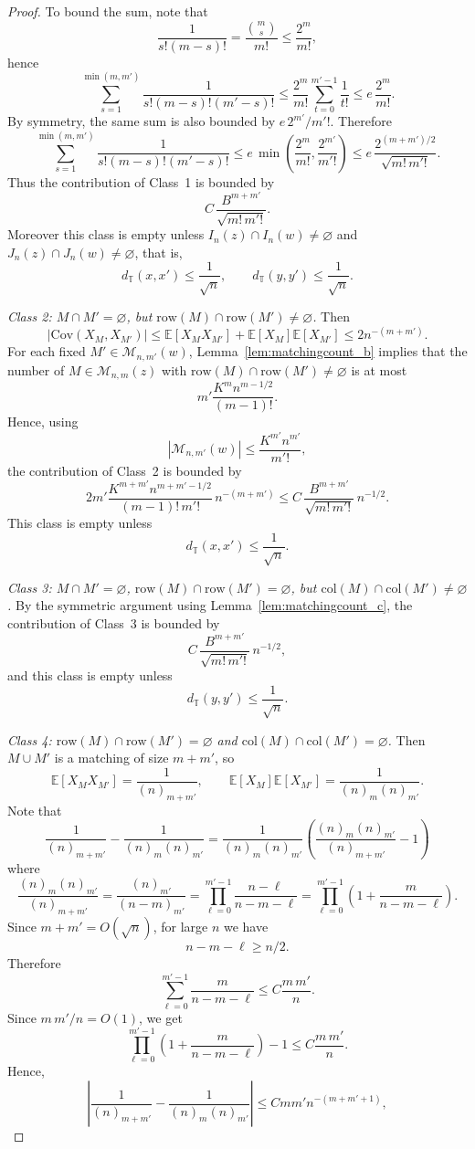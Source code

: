 \documentclass[11pt]{article}
\newcommand{\cov}{\mathrm{Cov}}
\begin{document}
\begin{proof}
To bound the sum, note that
\[
\frac{1}{s!(m-s)!}=\frac{\binom{m}{s}}{m!}\le \frac{2^m}{m!},
\]
hence
\[
\sum_{s=1}^{\min(m,m')}
\frac{1}{s!(m-s)!(m'-s)!}
\le
\frac{2^m}{m!}\sum_{t=0}^{m'-1}\frac{1}{t!}
\le
e\,\frac{2^m}{m!}.
\]
By symmetry, the same sum is also bounded by $e\,2^{m'}/m'!$. Therefore
\[
\sum_{s=1}^{\min(m,m')}
\frac{1}{s!(m-s)!(m'-s)!}
\le
e\,\min\!\left(\frac{2^m}{m!},\frac{2^{m'}}{m'!}\right)
\le
e\,\frac{2^{(m+m')/2}}{\sqrt{m!\,m'!}}.
\]
Thus the contribution of Class~1 is bounded by
\[
C\,\frac{B^{m+m'}}{\sqrt{m!\,m'!}}.
\]
Moreover this class is empty unless $I_n(z)\cap I_n(w)\neq\varnothing$ and $J_n(z)\cap J_n(w)\neq\varnothing$, that is,
\[
d_{\mathbb{T}}(x, x') \leq \frac{1}{\sqrt{n}}, \qquad d_{\mathbb{T}}(y, y') \leq \frac{1}{\sqrt{n}}.
\]

\smallskip
\noindent
\emph{Class 2: $M\cap M'=\varnothing$, but $\mathrm{row}(M)\cap\mathrm{row}(M')\neq\varnothing$.}
Then
\[
|\cov(X_M,X_{M'})|
\le
\mathbb{E}[X_MX_{M'}]+\mathbb{E}[X_M]\mathbb{E}[X_{M'}]
\le
2n^{-(m+m')}.
\]
For each fixed $M'\in\mathcal M_{n,m'}(w)$, Lemma~\ref{lem:matchingcount_b} implies that the number of
$M\in\mathcal M_{n,m}(z)$ with $\mathrm{row}(M)\cap\mathrm{row}(M')\neq\varnothing$ is at most
\[
m'\frac{K^m n^{m-1/2}}{(m-1)!}.
\]
Hence, using
\[
|\mathcal M_{n,m'}(w)|\le \frac{K^{m'} n^{m'}}{m'!},
\]
the contribution of Class~2 is bounded by
\[
2m'\frac{K^{m+m'} n^{m+m'-1/2}}{(m-1)!\,m'!}\,n^{-(m+m')}
\le
C\,\frac{B^{m+m'}}{\sqrt{m!\,m'!}}\,n^{-1/2}.
\]
This class is empty unless
\[
d_{\mathbb{T}}(x, x') \leq \frac{1}{\sqrt{n}}.
\]

\smallskip
\noindent
\emph{Class 3: $M\cap M'=\varnothing$, $\mathrm{row}(M)\cap\mathrm{row}(M')=\varnothing$, but
$\mathrm{col}(M)\cap\mathrm{col}(M')\neq\varnothing$.}
By the symmetric argument using Lemma~\ref{lem:matchingcount_c}, the contribution of Class~3 is bounded by
\[
C\,\frac{B^{m+m'}}{\sqrt{m!\,m'!}}\,n^{-1/2},
\]
and this class is empty unless
\[
d_{\mathbb{T}}(y, y') \leq \frac{1}{\sqrt{n}}.
\]

\smallskip
\noindent
\emph{Class 4: $\mathrm{row}(M)\cap\mathrm{row}(M')=\varnothing$ and $\mathrm{col}(M)\cap\mathrm{col}(M')=\varnothing$.}
Then $M\cup M'$ is a matching of size $m+m'$, so
\[
\mathbb{E}[X_MX_{M'}]=\frac{1}{(n)_{m+m'}},
\qquad
\mathbb{E}[X_M]\mathbb{E}[X_{M'}]=\frac{1}{(n)_m (n)_{m'}}.
\]
Note that 
\[
\frac{1}{(n)_{m+m'}}-\frac{1}{(n)_m (n)_{m'}} = \frac{1}{(n)_{m}(n)_{m'}}\left( \frac{(n)_{m}(n)_{m'}}{(n)_{m + m'}} - 1\right)
\]
where 
\[
\frac{(n)_{m}(n)_{m'}}{(n)_{m + m'}} = \frac{(n)_{m'}}{(n - m)_{m'}} = \prod_{\ell = 0}^{m' - 1}\frac{n - \ell}{n - m - \ell} = \prod_{\ell = 0}^{m' - 1}\left(1 + \frac{m}{n - m - \ell}\right).
\]
Since $m + m' = O(\sqrt{n})$, for large $n$ we have
\[
n - m - \ell \geq n/2.
\]
Therefore 
\[
\sum_{\ell = 0}^{m' - 1}\frac{m}{n - m - \ell} \leq C\frac{m\,m'}{n}.
\]
Since $m\, m' / n = O(1)$, we get
\[
\prod_{\ell = 0}^{m' - 1}\left(1 + \frac{m}{n - m - \ell}\right) - 1 \leq C\frac{m\,m'}{n}.
\]
Hence,
\[
\left|
\frac{1}{(n)_{m+m'}}-\frac{1}{(n)_m (n)_{m'}}
\right|
\le
C m m' n^{-(m+m'+1)},
\]



\end{proof}
\end{document}
